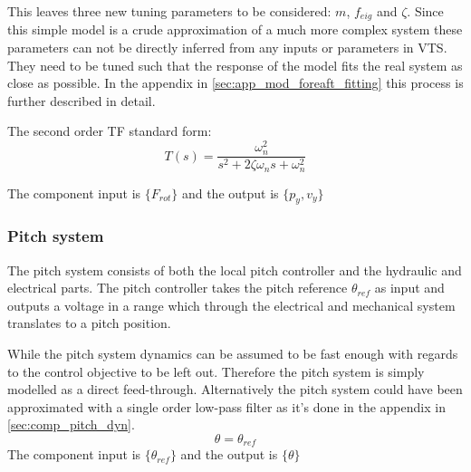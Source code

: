 This leaves three new tuning parameters to be considered: $ m $, $ f_{eig} $ and $ \zeta $. Since this simple model is a crude approximation of a much more complex system these parameters can not be directly inferred from any inputs or parameters in VTS. They need to be tuned such that the response of the model fits the real system as close as possible. In the appendix in \cref{sec:app_mod_foreaft_fitting} this process is further described in detail.

\medskip
The second order TF standard form:
\begin{equation}\label{eq:std_tf}
	T(s) = \dfrac{\omega_n^2}{s^2 + 2 \zeta \omega_n s + \omega_n^2}
\end{equation}

The component input is $ \{F_{rot} \} $ and the output is $ \{p_y, v_y\} $


\subsubsection{Pitch system} \label{sec:comp_pitch}
The pitch system consists of both the local pitch controller and the hydraulic and electrical parts. The pitch controller takes the pitch reference $ \theta_{ref} $ as input and outputs a voltage in a range which through the electrical and mechanical system translates to a pitch position. 

While the pitch system dynamics can be assumed to be fast enough with regards to the control objective to be left out. Therefore the pitch system is simply modelled as a direct feed-through. Alternatively the pitch system could have been approximated with a single order low-pass filter as it's done in the appendix in \cref{sec:comp_pitch_dyn}. 
\begin{equation}\label{eq:comp_pitch_freq}
	\theta = \theta_{ref}
\end{equation}
The component input is $ \{\theta_{ref}\} $ and the output is $ \{\theta \} $


